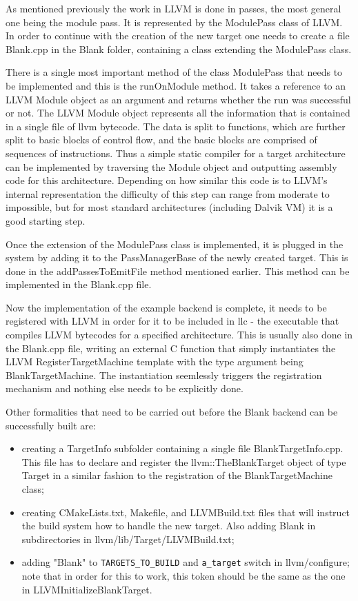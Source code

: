 \documentclass[parskip]{cs4rep}
\begin{document}
As mentioned previously the work in LLVM is done in passes, the most general one being the module pass. It is represented by the ModulePass class of LLVM. In order to continue with the creation of the new target one needs to create a file Blank.cpp in the Blank folder, containing a class extending the ModulePass class.

There is a single most important method of the class ModulePass that needs to be implemented and this is the runOnModule method. It takes a reference to an LLVM Module object as an argument and returns whether the run was successful or not. The LLVM Module object represents all the information that is contained in a single file of llvm bytecode. The data is split to functions, which are further split to basic blocks of control flow, and the basic blocks are comprised of sequences of instructions. Thus a simple static compiler for a target architecture  can be implemented by traversing the Module object and outputting assembly code for this architecture. Depending on how similar this code is to LLVM's internal representation the difficulty of this step can range from moderate to impossible, but for most standard architectures (including Dalvik VM) it is a good starting step.

Once the extension of the ModulePass class is implemented, it is plugged in the system by adding it to the PassManagerBase of the newly created target. This is done in the addPassesToEmitFile method mentioned earlier. This method can be implemented in the Blank.cpp file.

Now the implementation of the example backend is complete, it needs to be registered with LLVM in order for it to be included in llc - the executable that compiles LLVM bytecodes for a specified architecture. This is usually also done in the Blank.cpp file, writing an external C function that simply instantiates the LLVM RegisterTargetMachine template with the type argument being BlankTargetMachine. The instantiation seemlessly triggers the registration mechanism and nothing else needs to be explicitly done.

Other formalities that need to be carried out before the Blank backend can be successfully built are:
\begin{itemize}
\item
creating a TargetInfo subfolder containing a single file BlankTargetInfo.cpp. This file has to declare and register the llvm::TheBlankTarget object of type Target in a similar fashion to the registration of the BlankTargetMachine class;
\item
creating CMakeLists.txt, Makefile, and LLVMBuild.txt files that will instruct the build system how to handle the new target. Also adding Blank in subdirectories in llvm/lib/Target/LLVMBuild.txt;
\item
adding "Blank" to \verb|TARGETS_TO_BUILD| and \verb|a_target| switch in llvm/configure; note that in order for this to work, this token should be the same as the one in LLVMInitializeBlankTarget.
\end{itemize}
\end{document}
